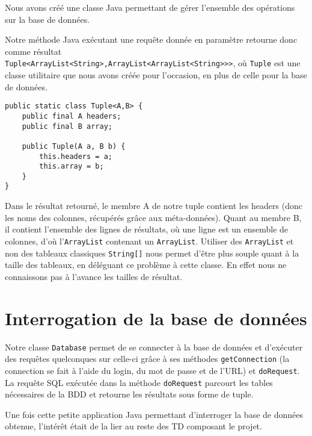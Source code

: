 Nous avons créé une classe Java permettant de gérer l'ensemble des opérations sur la base de données.

\medskip

Notre méthode Java exécutant une requête donnée en paramètre retourne donc comme résultat\\
\lstinline{Tuple<ArrayList<String>,ArrayList<ArrayList<String>>>}, où \lstinline{Tuple} est une classe utilitaire que nous avons créée pour l'occasion, en plus de celle pour la base de données.

\java
\begin{lstlisting}
public static class Tuple<A,B> {
	public final A headers;
	public final B array;

	public Tuple(A a, B b) {
		this.headers = a;
		this.array = b;
	}
}
\end{lstlisting}

Dans le résultat retourné, le membre A de notre tuple contient les headers (donc les noms des colonnes, récupérés grâce aux méta-données). Quant au membre B, il contient l'ensemble des lignes de résultats, où une ligne est un ensemble de colonnes, d'où l'\lstinline{ArrayList} contenant un \lstinline{ArrayList}. Utiliser des \lstinline{ArrayList} et non des tableaux classiques \lstinline{String[]} nous permet d'être plus souple quant à la taille des tableaux, en déléguant ce problème à cette classe. En effet nous ne connaissons pas à l'avance les tailles de résultat.

\section{Interrogation de la base de données}

Notre classe \lstinline{Database} permet de se connecter à la base de données et d'exécuter des requêtes quelconques sur celle-ci grâce à ses méthodes \lstinline{getConnection} (la connection se fait à l'aide du login, du mot de passe et de l'URL) et \lstinline{doRequest}.
La requête SQL exécutée dans la méthode \lstinline{doRequest} parcourt les tables nécessaires de la BDD et retourne les résultats sous forme de tuple.

\medskip

Une fois cette petite application Java permettant d'interroger la base de données obtenue, l'intérêt était de la lier au reste des TD composant le projet.
